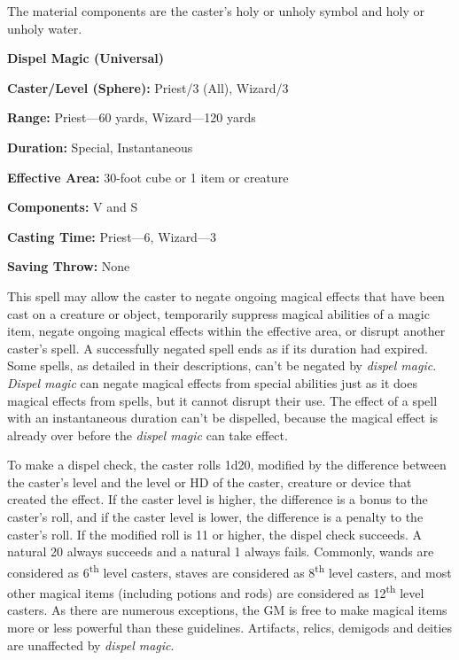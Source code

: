 \begin{multicols}{2}
The material components are the caster's holy or unholy symbol and holy or unholy water.

\vspace{1em}

\noindent
\begin{minipage}{\columnwidth}

\noindent \textbf{Dispel Magic (Universal)}

\noindent \textbf{Caster/Level (Sphere):} Priest/3 (All), Wizard/3

\noindent \textbf{Range:} Priest---60 yards, Wizard---120 yards

\noindent \textbf{Duration:} Special, Instantaneous

\noindent \textbf{Effective Area:} 30-foot cube or 1 item or creature

\noindent \textbf{Components:} V and S

\noindent \textbf{Casting Time:} Priest---6, Wizard---3

\noindent \textbf{Saving Throw:} None

\end{minipage}

This spell may allow the caster to negate ongoing magical effects that have been cast on a creature or object, temporarily suppress magical abilities of a magic item, negate ongoing magical effects within the effective area, or disrupt another caster's spell.  A successfully negated spell ends as if its duration had expired.  Some spells, as detailed in their descriptions, can't be negated by \textit{dispel magic}.  \textit{Dispel magic} can negate magical effects from special abilities just as it does magical effects from spells, but it cannot disrupt their use.  The effect of a spell with an instantaneous duration can't be dispelled, because the magical effect is already over before the \textit{dispel magic} can take effect.  

To make a dispel check, the caster rolls 1d20, modified by the difference between the caster's level and the level or HD of the caster, creature or device that created the effect.  If the caster level is higher, the difference is a bonus to the caster's roll, and if the caster level is lower, the difference is a penalty to the caster's roll.  If the modified roll is 11 or higher, the dispel check succeeds.  A natural 20 always succeeds and a natural 1 always fails.  Commonly, wands are considered as 6\textsuperscript{th} level casters, staves are considered as 8\textsuperscript{th} level casters, and most other magical items (including potions and rods) are considered as 12\textsuperscript{th} level casters.  As there are numerous exceptions, the GM is free to make magical items more or less powerful than these guidelines.  Artifacts, relics, demigods and deities are unaffected by \textit{dispel magic}. 


\end{multicols}
